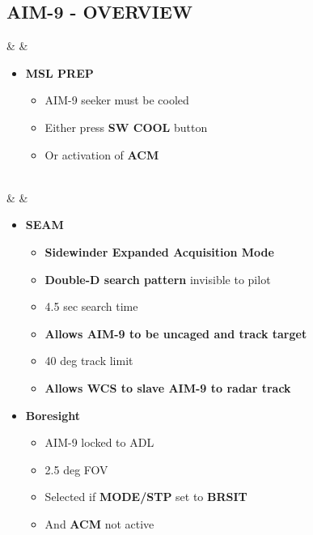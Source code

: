 \documentclass[fontInter]{TechCheck}
\begin{document}
	\subsection{AIM-9 - OVERVIEW}
	\begin{listlongtable}
		\textbf{\textbullet} &  \hfill \null {} \thumbnar &
		\begin{minipage}[t]{\linewidth}
			\vspace{-7pt}
			\begin{itemize}
				\item \textbf{MSL PREP}
				\begin{itemize}
					\item AIM-9 seeker must be cooled
					\item Either press \textbf{SW COOL} button
					\item Or activation of \textbf{ACM}
				\end{itemize}
			\end{itemize}
		\end{minipage} \\
		\midrule
		\textbf{\textbullet} &  &
		\begin{minipage}[t]{\linewidth}
			\vspace{-7pt}
			\begin{itemize}
				\item \textbf{SEAM}
				\begin{itemize}
					\item \textbf{Sidewinder Expanded Acquisition Mode}
					\item \textbf{Double-D search pattern} invisible to pilot
					\item 4.5 sec search time
					\item \textbf{Allows AIM-9 to be uncaged and track target}
					\item 40 deg track limit
					\item \textbf{Allows WCS to slave AIM-9 to radar track}
				\end{itemize}
				\item \textbf{Boresight}
				\begin{itemize}
					\item AIM-9 locked to ADL
					\item 2.5 deg FOV
					\item Selected if  \textbf{MODE/STP} set to \textbf{BRSIT}
					\item And \textbf{ACM} not active
				\end{itemize}

\end{itemize}
\end{minipage}
\end{listlongtable}
\end{document}
